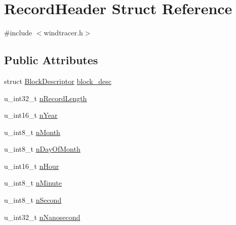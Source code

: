 \hypertarget{structRecordHeader}{\section{Record\-Header Struct Reference}
\label{structRecordHeader}
}


{\ttfamily \#include $<$windtracer.\-h$>$}

\subsection*{Public Attributes}
\begin{DoxyCompactItemize}
\item 
struct \hyperlink{structBlockDescriptor}{Block\-Descriptor} \hyperlink{structRecordHeader_a7978ce5ffe661553c29095b2d6e4f5ff}{block\-\_\-desc}
\item 
u\-\_\-int32\-\_\-t \hyperlink{structRecordHeader_ab2c22b9c223c2192b276e9b974a6640c}{n\-Record\-Length}
\item 
u\-\_\-int16\-\_\-t \hyperlink{structRecordHeader_a3064cb361ad0ee08e205e6734ef92a54}{n\-Year}
\item 
u\-\_\-int8\-\_\-t \hyperlink{structRecordHeader_acf999654ab3109a2f640142b42fb8ba2}{n\-Month}
\item 
u\-\_\-int8\-\_\-t \hyperlink{structRecordHeader_aae558468424437231838e93dd67fbc90}{n\-Day\-Of\-Month}
\item 
u\-\_\-int16\-\_\-t \hyperlink{structRecordHeader_af193bef18555926c67fcfcf8c1ef085a}{n\-Hour}
\item 
u\-\_\-int8\-\_\-t \hyperlink{structRecordHeader_ab1766b542399f561a846005f260ff19e}{n\-Minute}
\item 
u\-\_\-int8\-\_\-t \hyperlink{structRecordHeader_a5c5f81841da5dcb626f100c066ae6b13}{n\-Second}
\item 
u\-\_\-int32\-\_\-t \hyperlink{structRecordHeader_a0c741452a2f775a312239ed78bf2b1af}{n\-Nanosecond}
\end{DoxyCompactItemize}


